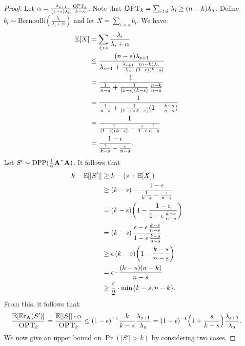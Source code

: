 \documentclass{article}
\begin{document}
    \begin{proof}
      Let $\alpha=\frac{\lambda_{s+1}}{(1-\epsilon)\lambda_n}\frac{{\textsc{OPT}_k}}{k-s}$.
Note that ${\textsc{OPT}_k}=\sum_{i>k}\lambda_i\geq (n-k)\lambda_n$. Define
$b_i\sim\mathrm{Bernoulli}(\frac{\lambda_i}{\lambda_i+\alpha})$ and
let $X=\sum_{i>s}b_i$. We have: 
\begin{align*}
          \mathbb E[X]&= \sum_{i>s}\frac{\lambda_i}{\lambda_i+\alpha}\\
          &\leq 
            \frac{(n-s)\lambda_{s+1}}{\lambda_{s+1}+
            \frac{\lambda_{s+1}}{\lambda_n}\frac{(n-k)\lambda_n}{(1-\epsilon)(k-s)}}\\
          &= \frac{1}{\frac1{n-s} +
            \frac1{(1-\epsilon)(k-s)}\,\frac{n-k}{n-s}} \\
          &= \frac{1}{\frac1{n-s} +
            \frac{1}{(1-\epsilon)(k-s)}(1-\frac{k-s}{n-s})}\\
          &=\frac{1}{\frac{1}{(1-\epsilon)(k-s)} -
            \frac{\epsilon}{1-\epsilon}\frac1{n-s}}\\
          &=\frac{1-\epsilon}{\frac1{k-s}-\frac\epsilon{n-s}}.
\end{align*}
Let $S'\sim\DPP(\frac1\alpha\A^\top\A)$. It follows that
\begin{align*}
  k-\mathbb E[|S'|]&\geq k -(s+\mathbb E[X])\\
  & \geq (k-s) -
  \frac{1-\epsilon}{\frac1{k-s}-\frac\epsilon{n-s}}\\
&=(k-s)\bigg(1-\frac{1-\epsilon}{1-\epsilon\,\frac{k-s}{n-s}}\bigg)\\
&=(k-s)\,\frac{\epsilon - \epsilon\,
\frac{k-s}{n-s}}{1-\epsilon\,\frac{k-s}{n-s}}\\
             &\geq \epsilon\,(k-s)\bigg(1-\frac{k-s}{n-s}\bigg)\\
             &=\epsilon\cdot\frac{(k-s)(n-k)}{n-s}\\
  &\geq \frac\epsilon2\cdot\min\{k-s,n-k\}.
\end{align*}
From this, it follows that:
\begin{align*}
  \frac{\mathbb E[\mathrm{Er}_\mathbf A(S')]}{{\textsc{OPT}_k}}=\frac{\mathbb E[|S|]\cdot\alpha}{{\textsc{OPT}_k}}\leq
(1-\epsilon)^{-1}  \frac k{k-s}\frac{\lambda_{s+1}}{\lambda_n} =
(1-\epsilon)^{-1}\Big(1+\frac s{k-s}\Big)\frac{\lambda_{s+1}}{\lambda_n}.
\end{align*}
We now give an upper bound on $\Pr(|S'|>k)$ by considering two
cases.


\end{proof}
\end{document}
